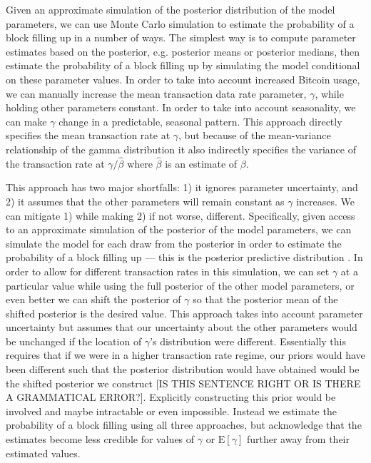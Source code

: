 \documentclass{article}
\begin{document}
Given an approximate simulation of the posterior distribution of the model parameters, we can use Monte Carlo simulation to estimate the probability of a block filling up in a number of ways. The simplest way is to compute parameter estimates based on the posterior, e.g. posterior means or posterior medians, then estimate the probability of a block filling up by simulating the model conditional on these parameter values. In order to take into account increased Bitcoin usage, we can manually increase the mean transaction data rate parameter, $\gamma$, while holding other parameters constant. In order to take into account seasonality, we can make $\gamma$ change in a predictable, seasonal pattern. This approach directly specifies the mean transaction rate at $\gamma$, but because of the mean-variance relationship of the gamma distribution it also indirectly specifies the variance of the transaction rate at $\gamma/\hat{\beta}$ where $\hat{\beta}$ is an estimate of $\beta$.

This approach has two major shortfalls: 1) it ignores parameter uncertainty, and 2) it assumes that the other parameters will remain constant as $\gamma$ increases. We can mitigate 1) while making 2) if not worse, different. Specifically, given access to an approximate simulation of the posterior of the model parameters, we can simulate the model for each draw from the posterior in order to estimate the probability of a block filling up --- this is the posterior predictive distribution \citep{gelman2014bayesian}. In order to allow for different transaction rates in this simulation, we can set $\gamma$ at a particular value while using the full posterior of the other model parameters, or even better we can shift the posterior of $\gamma$ so that the posterior mean of the shifted posterior is the desired value. This approach takes into account parameter uncertainty but assumes that our uncertainty about the other parameters would be unchanged if the location of $\gamma$'s distribution were different. Essentially this requires that if we were in a higher transaction rate regime, our priors would have been different such that the posterior distribution would have obtained would be the shifted posterior we construct [IS THIS SENTENCE RIGHT OR IS THERE A GRAMMATICAL ERROR?]. Explicitly constructing this prior would be involved and maybe intractable or even impossible. Instead we estimate the probability of a block filling using all three approaches, but acknowledge that the estimates become less credible for values of $\gamma$ or $\mathrm{E}[\gamma]$ further away from their estimated values.
\end{document}
